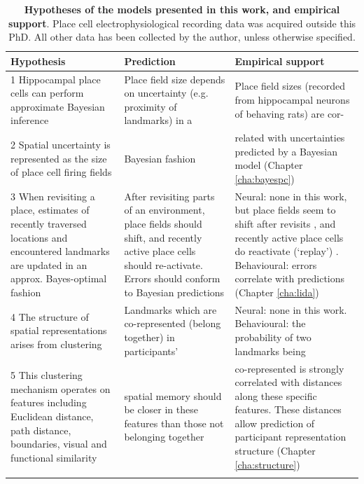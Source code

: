 \setlength\tabcolsep{4pt}
\begin{longtable}{|p{4.5cm}|p{4.5cm}|p{4.6cm}|}
	\hline
	\textbf{Hypothesis} & \textbf{Prediction} & \textbf{Empirical support} \\
	\hline
	
	1 Hippocampal place cells can perform approximate Bayesian inference & {Place field size depends on uncertainty (e.g. proximity of landmarks) in a} & {Place field sizes (recorded from hippocampal neurons of behaving rats) are cor-} \\ \cline{1-1} 
	2 Spatial uncertainty is represented as the size of place cell firing fields & Bayesian fashion & related with uncertainties predicted by a Bayesian model (Chapter \ref{cha:bayespc}) \\ \hline
	3 When revisiting a place, estimates of recently traversed locations and encountered landmarks are updated in an approx. Bayes-optimal fashion & After revisiting parts of an environment, place fields should shift, and recently active place cells should re-activate. Errors should conform to Bayesian predictions & Neural: none in this work, but place fields seem to shift after revisits \citep{mehta2000experience}, and recently active place cells do reactivate (`replay') \citep{carr2011hippocampal}. Behavioural: errors correlate with predictions (Chapter \ref{cha:lida}) \\ \hline 
	4 The structure of spatial representations arises from clustering & Landmarks which are co-represented (belong together) in participants' & Neural: none in this work. Behavioural: the probability of two landmarks being \\ \cline{1-1}
	5 This clustering mechanism operates on features including Euclidean distance, path distance, boundaries, visual and functional similarity & spatial memory should be closer in these features than those not belonging together & co-represented is strongly correlated with distances along these specific features. These distances allow prediction of participant representation structure (Chapter \ref{cha:structure}) \\
	
	\hline
	\captionsetup{width=\textwidth}
	\caption[Hypotheses of the models presented in this work]{\textbf{Hypotheses of the models presented in this work, and empirical support}. Place cell electrophysiological recording data was acquired outside this PhD. All other data has been collected by the author, unless otherwise specified.}
	\label{tbl:hyp}
\end{longtable}



